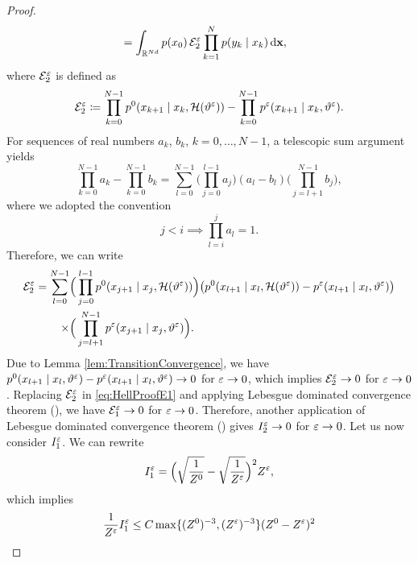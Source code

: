 \documentclass[10pt]{article}
\begin{document}
\begin{proof}
\begin{equation}
\begin{aligned}
		&= \int_{\mathbb{R}^{Nd}} p(x_0) \, \mathcal E_2^\varepsilon \prod_{k=1}^{N} p(y_k \mid x_k) \,\mathrm{d} \mathbf x,
	\end{aligned}
	\end{equation}
	where $\mathcal E_2^\varepsilon$ is defined as
	\begin{equation}
		\mathcal E_2^\varepsilon \coloneqq \prod_{k=0}^{N-1} p^0(x_{k+1}\mid x_k, \mathcal H(\vartheta^\varepsilon)) - \prod_{k=0}^{N-1} p^\varepsilon(x_{k+1}\mid x_k, \vartheta^\varepsilon).
	\end{equation}
	For sequences of real numbers $a_k$, $b_k$, $k = 0, \ldots, N-1$, a telescopic sum argument yields 
	\begin{equation} 
		\prod_{k=0}^{N-1} a_k - \prod_{k=0}^{N-1} b_k = \sum_{l=0}^{N-1} \Big(\prod_{j=0}^{l-1} a_j\Big)(a_l - b_l) \Big(\prod_{j=l+1}^{N-1} b_j\Big),
	\end{equation}
	where we adopted the convention
	\begin{equation}
		j < i \implies \prod_{l=i}^j a_l = 1.
	\end{equation}
	Therefore, we can write
	\begin{equation}
	\begin{aligned}
		\mathcal E_2^\varepsilon = \sum_{l=0}^{N-1} &\Big(\prod_{j=0}^{l-1} p^0(x_{j+1}\mid x_j, \mathcal H(\vartheta^\varepsilon)) \Big) \big(p^0(x_{l+1}\mid x_l, \mathcal H(\vartheta^\varepsilon)) - p^\varepsilon(x_{l+1}\mid x_l, \vartheta^\varepsilon)\big)\\
		\times &\Big(\prod_{j=l+1}^{N-1} p^\varepsilon(x_{j+1}\mid x_j, \vartheta^\varepsilon)\Big).
	\end{aligned}
	\end{equation}
	Due to Lemma \ref{lem:TransitionConvergence}, we have $p^0(x_{l+1}\mid x_l, \vartheta^\varepsilon) - p^\varepsilon(x_{l+1}\mid x_l, \vartheta^\varepsilon) \to 0$ for $ \varepsilon \to 0$, which implies $\mathcal E_2^\varepsilon \to 0$ for $\varepsilon \to 0$. Replacing $\mathcal E^\varepsilon_2$ in \eqref{eq:HellProofE1} and applying Lebesgue dominated convergence theorem (), we have $\mathcal E^\varepsilon_1 \to 0$ for $\varepsilon \to 0$. Therefore, another application of Lebesgue dominated convergence theorem () gives $I_2^\varepsilon \to 0$ for $\varepsilon \to 0$. Let us now consider $I_1^\varepsilon$. We can rewrite 
	\begin{equation}
		I_1^\varepsilon = \Big(\sqrt{\frac{1}{Z^0}} - \sqrt{\frac{1}{Z^\varepsilon}}\Big)^2 Z^\varepsilon,
	\end{equation}
	which implies
	\begin{equation}
	\begin{aligned}
		\frac{1}{Z^\epl}I_1^\epl &\leq C \max\{(Z^0)^{-3}, (Z^\epl)^{-3}\}(Z^0 - Z^\epl)^2\\

\end{aligned}
\end{equation}
\end{proof}
\end{document}
